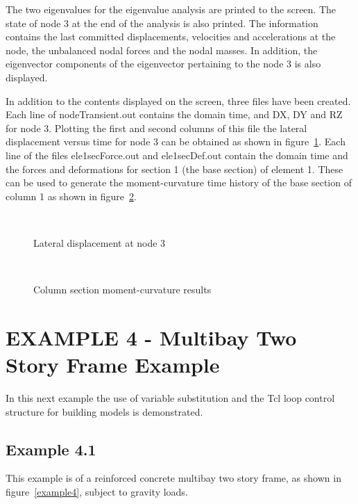\documentclass[12pt]{article}
\begin{document}
The two eigenvalues for the eigenvalue analysis are printed to the
screen. The state of node 3 at the end of the analysis is also
printed. 
The information contains the last committed displacements,
velocities and accelerations at the node, the unbalanced nodal forces
and the nodal masses. In addition, the eigenvector components of the
eigenvector pertaining to the node 3 is also displayed.

In addition to the contents displayed on the screen, three files have been
created. Each line of nodeTransient.out contains the domain
time, and DX, DY and RZ for node 3. Plotting the first and second
columns of this file the lateral displacement versus time for node 3
can be obtained as shown in figure~\ref{lateral33}. Each line of the files
ele1secForce.out and ele1secDef.out contain the domain time and the
forces and deformations for section 1 (the base section) of element
1. These can be used to generate the moment-curvature time history of
the base section of column 1 as shown in figure~\ref{element1MK}.



\begin{figure}[htpb]
\begin{center}
\leavevmode
\hbox{%
\epsfxsize=6.0in
}
\end{center}
\caption{Lateral displacement at node 3}
\label{lateral33}
\end{figure}

\begin{figure}[htpb]
\begin{center}
\leavevmode
\hbox{%
\epsfxsize=6.25in
}
\end{center}
\caption{Column section moment-curvature results}
\label{element1MK}
\end{figure}


\pagebreak
\pagebreak

\section {EXAMPLE 4 - Multibay Two Story Frame Example}

In this next example the use of variable substitution and the Tcl loop
control structure for building models is demonstrated.

\subsection{Example 4.1}
This example is of a reinforced concrete multibay two story
frame, as shown in figure~\ref{example4}, subject to gravity loads. 
\end{document}
